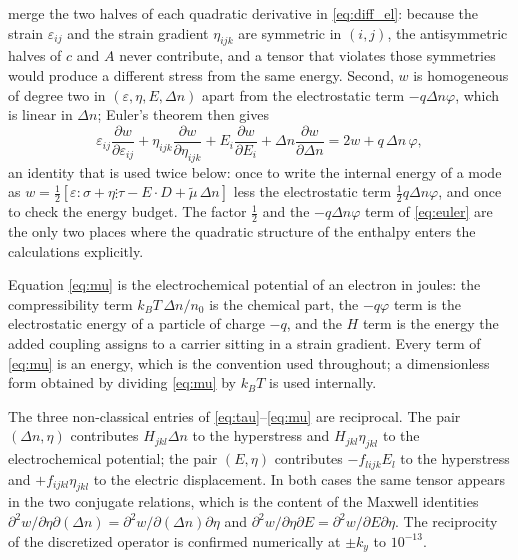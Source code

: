 merge the two halves of each quadratic derivative in \eqref{eq:diff_el}: because
the strain $\varepsilon_{ij}$ and the strain gradient $\eta_{ijk}$ are symmetric
in $(i,j)$, the antisymmetric halves of $c$ and $A$ never contribute, and a
tensor that violates those symmetries would produce a different stress from the
same energy.  Second, $w$ is homogeneous of degree two in
$(\varepsilon,\eta,E,\Delta n)$ apart from the electrostatic term $-q\Delta n
\varphi$, which is linear in $\Delta n$; Euler's theorem then gives
\begin{equation}
\label{eq:euler}
\varepsilon_{ij}\frac{\partial w}{\partial\varepsilon_{ij}}
+\eta_{ijk}\frac{\partial w}{\partial\eta_{ijk}}
+E_i\frac{\partial w}{\partial E_i}
+\Delta n\frac{\partial w}{\partial\Delta n}
=2w+q\,\Delta n\,\varphi ,
\end{equation}
an identity that is used twice below: once to write the internal energy of a mode
as $w=\tfrac12[\varepsilon:\sigma+\eta\vdots\tau-E\cdot D+\widetilde\mu\,\Delta n]$
less the electrostatic term $\tfrac12 q\Delta n\varphi$, and once to check the energy budget.  The factor $\tfrac12$ and the $-q\Delta n\varphi$
term of \eqref{eq:euler} are the only two places where the quadratic structure
of the enthalpy enters the calculations explicitly.

Equation \eqref{eq:mu} is the electrochemical potential of an electron in
joules: the compressibility term $k_BT\,\Delta n/n_0$ is the chemical part, the
$-q\varphi$ term is the electrostatic energy of a particle of charge $-q$, and
the $H$ term is the energy the added coupling assigns to a carrier sitting in a
strain gradient.  Every term of \eqref{eq:mu} is an energy, which is the convention used throughout; a dimensionless form obtained by dividing
\eqref{eq:mu} by $k_BT$ is used internally.

The three non-classical entries of \eqref{eq:tau}--\eqref{eq:mu} are reciprocal.
The pair $(\Delta n,\eta)$ contributes $H_{jkl}\Delta n$ to the hyperstress and
$H_{jkl}\eta_{jkl}$ to the electrochemical potential; the pair $(E,\eta)$
contributes $-f_{lijk}E_l$ to the hyperstress and $+f_{ijkl}\eta_{jkl}$ to the
electric displacement.  In both cases the same tensor appears in the two
conjugate relations, which is the content of the Maxwell identities
$\partial^2w/\partial\eta\partial(\Delta n)=\partial^2w/\partial(\Delta
n)\partial\eta$ and $\partial^2w/\partial\eta\partial E=\partial^2w/\partial
E\partial\eta$.  The reciprocity of the discretized operator is confirmed
numerically at $\pm k_y$ to $10^{-13}$.

